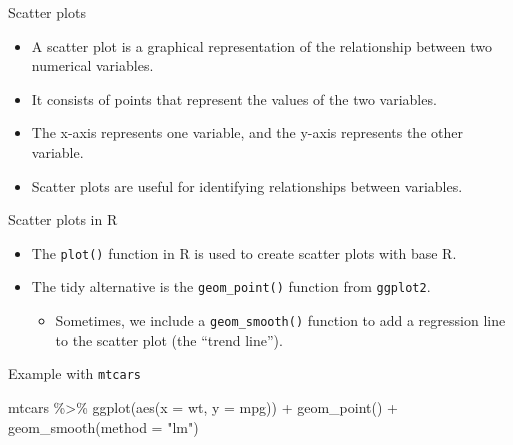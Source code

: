 \documentclass[
  10pt,
  ignorenonframetext,
]{beamer}
\newenvironment{Shaded}{\begin{snugshade}}{\end{snugshade}}
\newcommand{\AttributeTok}[1]{\textcolor[rgb]{0.40,0.45,0.13}{#1}}
\newcommand{\FunctionTok}[1]{\textcolor[rgb]{0.28,0.35,0.67}{#1}}
\newcommand{\NormalTok}[1]{\textcolor[rgb]{0.00,0.23,0.31}{#1}}
\newcommand{\SpecialCharTok}[1]{\textcolor[rgb]{0.37,0.37,0.37}{#1}}
\newcommand{\StringTok}[1]{\textcolor[rgb]{0.13,0.47,0.30}{#1}}
\providecommand{\tightlist}{%
  \setlength{\itemsep}{0pt}\setlength{\parskip}{0pt}}\usepackage{longtable,booktabs,array}
\begin{document}
\begin{frame}{Scatter plots}
\label{scatter-plots}
\begin{itemize}
\item
  A scatter plot is a graphical representation of the relationship
  between two numerical variables.
\item
  It consists of points that represent the values of the two variables.
\item
  The x-axis represents one variable, and the y-axis represents the
  other variable.
\item
  Scatter plots are useful for identifying relationships between
  variables.
\end{itemize}
\end{frame}

\begin{frame}[fragile]{Scatter plots in R}
\label{scatter-plots-in-r}
\begin{itemize}
\item
  The \texttt{plot()} function in R is used to create scatter plots with
  base R.
\item
  The tidy alternative is the \texttt{geom\_point()} function from
  \texttt{ggplot2}.

  \begin{itemize}
  \tightlist
  \item
    Sometimes, we include a \texttt{geom\_smooth()} function to add a
    regression line to the scatter plot (the ``trend line'').
  \end{itemize}
\end{itemize}
\end{frame}

\begin{frame}[fragile]{Example with \texttt{mtcars}}
\label{example-with-mtcars-5}
\begin{Shaded}
\begin{Highlighting}[]
\NormalTok{mtcars }\SpecialCharTok{\%\textgreater{}\%} 
    \FunctionTok{ggplot}\NormalTok{(}\FunctionTok{aes}\NormalTok{(}\AttributeTok{x =}\NormalTok{ wt, }\AttributeTok{y =}\NormalTok{ mpg)) }\SpecialCharTok{+}
    \FunctionTok{geom\_point}\NormalTok{() }\SpecialCharTok{+}
    \FunctionTok{geom\_smooth}\NormalTok{(}\AttributeTok{method =} \StringTok{"lm"}\NormalTok{)}
\end{Highlighting}
\end{Shaded}
\end{frame}
\end{document}

